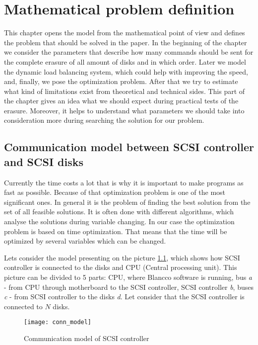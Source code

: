\chapter{Mathematical problem definition}
\label{chap3:title}

This chapter opens the model from the mathematical point of view and defines the problem that should be solved in the paper. In the beginning of the chapter we consider the parameters that describe how many commands should be sent for the complete erasure of all amount of disks and in which order. Later we model the dynamic load balancing system, which could help with improving the speed, and, finally, we pose the optimization problem. After that we try to estimate what kind of limitations exist from theoretical and technical sides. This part of the chapter gives an idea what we should expect during practical tests of the erasure. Moreover, it helps to understand what parameters we should take into consideration more during searching the solution for our problem.

\newpage
\section{Communication model between SCSI controller and SCSI disks}
Currently the time costs a lot that is why it is important to make programs as fast as possible. Because of that optimization problem is one of the most significant ones. In general it is the problem of finding the best solution from the set of all feasible solutions. It is often done with different algorithms, which analyse the solutions during variable changing. In our case the optimization problem is based on time optimization. That means that the time will be optimized by several variables which can be changed.

Lets consider the model presenting on the picture \ref{fig:conn_model}, which shows how SCSI controller is connected to the disks and CPU (Central processing unit). This picture can be divided to 5 parts: CPU, where Blancco software is running, bus \emph{a} - from CPU through motherboard to the SCSI controller, SCSI controller \emph{b}, buses \emph{c} - from SCSI controller to the disks \emph{d}. Let consider that the SCSI controller is connected to $N$ disks.

\begin{figure}[h]
\begin{center}
  \texttt{[image: conn\_model]}
\end{center}
  \caption{Communication model of SCSI controller}
  \label{fig:conn_model}
\end{figure}

